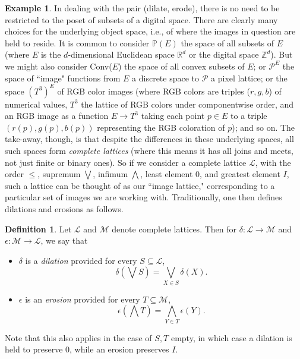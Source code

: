 \documentclass[11pt]{book}
\theoremstyle{definition}
\newtheorem{example}{Example}[section]
\theoremstyle{definition}
\newtheorem{definition}{Definition}[section]
\theoremstyle{definition}
\theoremstyle{theorem}
\theoremstyle{definition}
\begin{document}
\begin{example}
	In dealing with the pair (dilate, erode), there is no need to be restricted to the poset of subsets of a digital space. There are clearly many choices for the underlying object space, i.e., of where the images in question are held to reside. It is common to consider $\mathbb{P}(E)$ the space of all subsets of $E$ (where $E$ is the $d$-dimensional Euclidean space $\mathbb{R}^d$ or the digital space $\mathbb{Z}^d$). But we might also consider Conv($E$) the space of all convex subsets of $E$; or $\mathcal{P}^E$ the space of ``image" functions from $E$ a discrete space to $\mathcal{P}$ a pixel lattice; or the space $(T^3)^{E}$ of RGB color images (where RGB colors are triples ($r,g,b$) of numerical values, $T^3$ the lattice of RGB colors under componentwise order, and an RGB image as a function $E \rightarrow T^3$ taking each point $p \in E$ to a triple $(r(p), g(p), b(p))$ representing the RGB coloration of $p$); and so on. The take-away, though, is that despite the differences in these underlying spaces, all such spaces form \textit{complete lattices} (where this means it has all joins and meets, not just finite or binary ones). So if we consider a complete lattice $\mathcal{L}$, with the order $\leq$, supremum $\bigvee$, infimum $\bigwedge$, least element $0$, and greatest element $I$, such a lattice can be thought of as our ``image lattice," corresponding to a particular set of images we are working with. Traditionally, one then defines dilations and erosions as follows. 
	\begin{definition}  Let $\mathcal{L}$ and $\mathcal{M}$ denote complete lattices. Then for $\delta: \mathcal{L} \rightarrow \mathcal{M}$ and $\epsilon: \mathcal{M} \rightarrow \mathcal{L}$, we say that 
		\begin{itemize}
			\item $\delta$ is a \textit{dilation}  provided for every $S \subseteq  \mathcal{L}$, 
			\begin{equation}
			\delta(\bigvee S) = \bigvee_{X \in S} \delta(X). 
			\end{equation}
			\item $\epsilon$ is an \textit{erosion}  provided for every $T \subseteq  \mathcal{M}$, 
			\begin{equation}
			\epsilon(\bigwedge T) = \bigwedge_{Y \in T} \epsilon(Y). 
			\end{equation}
		\end{itemize}
		Note that this also applies in the case of $S, T$ empty, in which case a dilation is held to preserve $0$, while an erosion preserves $I$. 

\end{definition}
\end{example}
\end{document}
